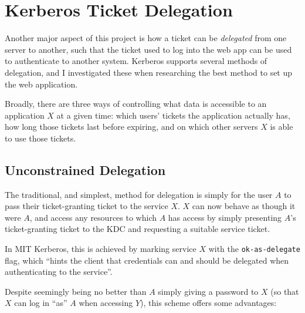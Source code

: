 \documentclass[12pt]{report}
\begin{document}
\section{Kerberos Ticket Delegation}
\label{sec:kerberos_ticket_delegation}
Another major aspect of this project is how a ticket can be \textit{delegated} from one server to another, such that the ticket used to log into the web app can be used to authenticate to another system. Kerberos supports several methods of delegation, and I investigated these when researching the best method to set up the web application.

Broadly, there are three ways of controlling what data is accessible to an application $X$ at a given time: which users' tickets the application actually has, how long those tickets last before expiring, and on which other servers $X$ is able to use those tickets.

\subsection{Unconstrained Delegation}
The traditional, and simplest, method for delegation is simply for the user $A$ to pass their ticket-granting ticket to the service $X$. $X$ can now behave as though it were $A$, and access any resources to which $A$ has access by simply presenting $A$'s ticket-granting ticket to the KDC and requesting a suitable service ticket\cite{JohnKol-unconstrained-deleg}.

In MIT Kerberos, this is achieved by marking service $X$ with the \verb+ok-as-delegate+ flag, which ``hints the client that credentials can and should be delegated when authenticating to the service''\cite{KDC-conf-docs}.

Despite seemingly being no better than $A$ simply giving a password to $X$ (so that $X$ can log in ``as'' $A$ when accessing $Y$), this scheme offers some advantages:
\end{document}
